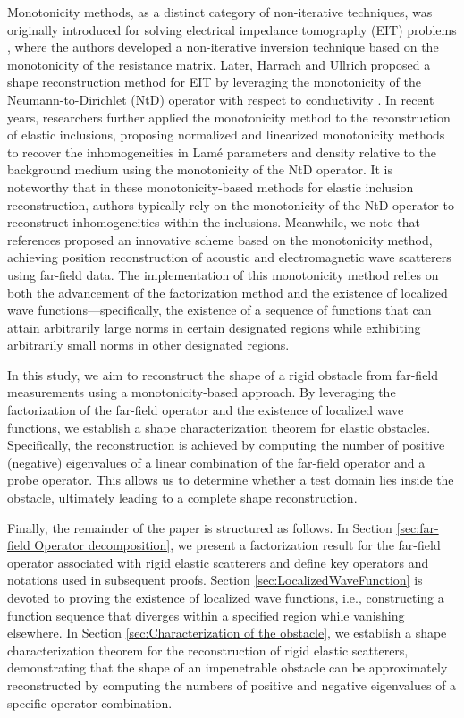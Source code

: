 \documentclass[11pt,reqno,twoside]{amsart}
\theoremstyle{definition}
\theoremstyle{remark}
\numberwithin{equation}{section}
\begin{document}
Monotonicity methods, as a distinct category of non-iterative techniques, was originally introduced for solving electrical impedance tomography (EIT) problems \cite{TR02}, where the authors developed a non-iterative inversion technique based on the monotonicity of the resistance matrix. Later, Harrach and Ullrich proposed a shape reconstruction method for EIT by leveraging the monotonicity of the Neumann-to-Dirichlet (NtD) operator with respect to conductivity \cite{BU13}. In recent years, researchers further applied the monotonicity method to the reconstruction of elastic inclusions, proposing normalized and linearized monotonicity methods to recover the inhomogeneities in Lam\'e parameters and density relative to the background medium using the monotonicity of the NtD operator\cite{EH21,EH23,EH24}. It is noteworthy that in these monotonicity-based methods for elastic inclusion reconstruction, authors typically rely on the monotonicity of the NtD operator to reconstruct inhomogeneities within the inclusions. Meanwhile, we note that references \cite{AG20,AG23} proposed an innovative scheme based on the monotonicity method, achieving position reconstruction of acoustic and electromagnetic wave scatterers using far-field data. The implementation of this monotonicity method relies on both the advancement of the factorization method and the existence of localized wave functions—specifically, the existence of a sequence of functions that can attain arbitrarily large norms in certain designated regions while exhibiting arbitrarily small norms in other designated regions.

In this study, we aim to reconstruct the shape of a rigid obstacle from far-field measurements using a monotonicity-based approach. By leveraging the factorization of the far-field operator and the existence of localized wave functions, we establish a shape characterization theorem for elastic obstacles. Specifically, the reconstruction is achieved by computing the number of positive (negative) eigenvalues of a linear combination of the far-field operator and a probe operator. This allows us to determine whether a test domain lies inside the obstacle, ultimately leading to a complete shape reconstruction.

Finally, the remainder of the paper is structured as follows. In Section \ref{sec:far-field Operator decomposition}, we present a factorization result for the far-field operator associated with rigid elastic scatterers and define key operators and notations used in subsequent proofs. Section \ref{sec:LocalizedWaveFunction} is devoted to proving the existence of localized wave functions, i.e., constructing a function sequence that diverges within a specified region while vanishing elsewhere. In Section \ref{sec:Characterization of the obstacle}, we establish a shape characterization theorem for the reconstruction of rigid elastic scatterers, demonstrating that the shape of an impenetrable obstacle can be approximately reconstructed by computing the numbers of positive and negative eigenvalues of a specific operator combination.
	
\end{document}
